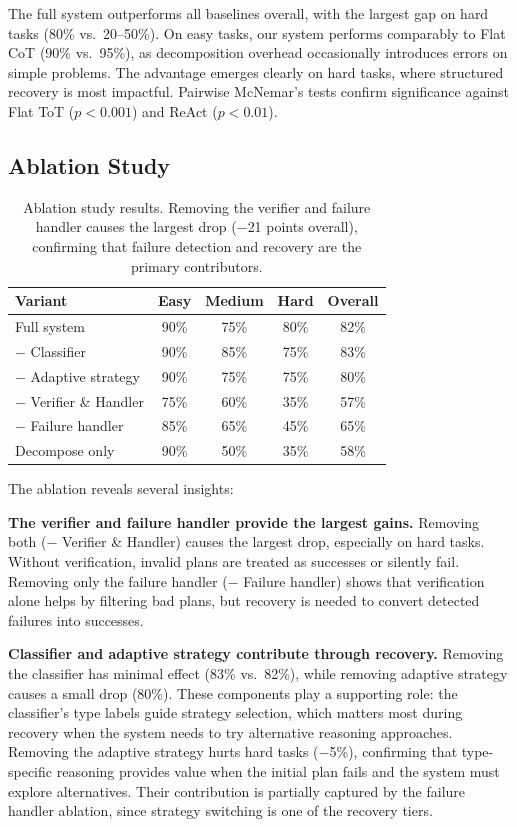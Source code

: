 \documentclass{article}
\begin{document}
The full system outperforms all baselines overall, with the largest gap on hard tasks (80\% vs.\ 20--50\%). On easy tasks, our system performs comparably to Flat CoT (90\% vs.\ 95\%), as decomposition overhead occasionally introduces errors on simple problems. The advantage emerges clearly on hard tasks, where structured recovery is most impactful. Pairwise McNemar's tests confirm significance against Flat ToT ($p < 0.001$) and ReAct ($p < 0.01$).

\subsection{Ablation Study}

\begin{table}[h]
\centering
\begin{tabular}{lcccc}
\toprule
\textbf{Variant} & \textbf{Easy} & \textbf{Medium} & \textbf{Hard} & \textbf{Overall} \\
\midrule
Full system & 90\% & 75\% & 80\% & 82\% \\
$-$ Classifier & 90\% & 85\% & 75\% & 83\% \\
$-$ Adaptive strategy & 90\% & 75\% & 75\% & 80\% \\
$-$ Verifier \& Handler & 75\% & 60\% & 35\% & 57\% \\
$-$ Failure handler & 85\% & 65\% & 45\% & 65\% \\
Decompose only & 90\% & 50\% & 35\% & 58\% \\
\bottomrule
\end{tabular}
\caption{Ablation study results. Removing the verifier and failure handler causes the largest drop ($-$21 points overall), confirming that failure detection and recovery are the primary contributors.}
\label{tab:ablation}
\end{table}

The ablation reveals several insights:

\textbf{The verifier and failure handler provide the largest gains.} Removing both ($-$ Verifier \& Handler) causes the largest drop, especially on hard tasks. Without verification, invalid plans are treated as successes or silently fail. Removing only the failure handler ($-$ Failure handler) shows that verification alone helps by filtering bad plans, but recovery is needed to convert detected failures into successes.

\textbf{Classifier and adaptive strategy contribute through recovery.} Removing the classifier has minimal effect (83\% vs.\ 82\%), while removing adaptive strategy causes a small drop (80\%). These components play a supporting role: the classifier's type labels guide strategy selection, which matters most during recovery when the system needs to try alternative reasoning approaches. Removing the adaptive strategy hurts hard tasks ($-$5\%), confirming that type-specific reasoning provides value when the initial plan fails and the system must explore alternatives. Their contribution is partially captured by the failure handler ablation, since strategy switching is one of the recovery tiers.
\end{document}
